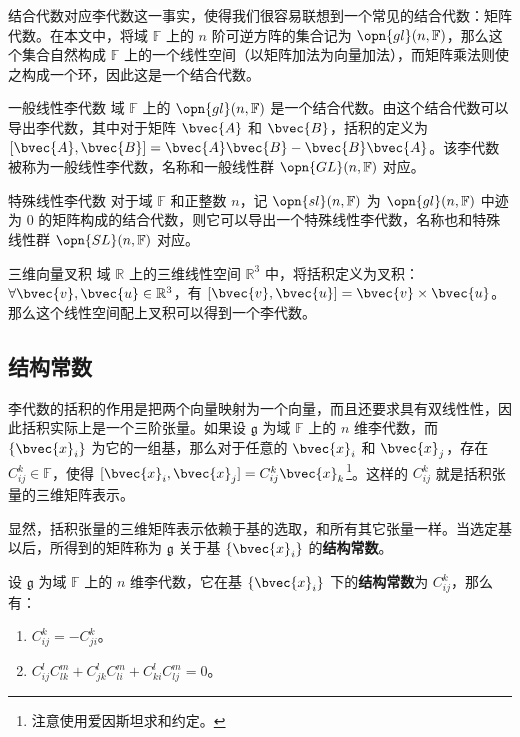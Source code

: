 结合代数对应李代数这一事实，使得我们很容易联想到一个常见的结合代数：矩阵代数。在本文中，将域 $\mathbb{F}$ 上的 $n$ 阶可逆方阵的集合记为 $\opn{gl}(n, \mathbb{F})$，那么这个集合自然构成 $\mathbb{F}$ 上的一个线性空间（以矩阵加法为向量加法），而矩阵乘法则使之构成一个环，因此这是一个结合代数。

\begin{example}{一般线性李代数}
域 $\mathbb{F}$ 上的 $\opn{gl}(n, \mathbb{F})$ 是一个结合代数。由这个结合代数可以导出李代数，其中对于矩阵 $\bvec{A}$ 和 $\bvec{B}$，括积的定义为 $[\bvec{A}, \bvec{B}]=\bvec{A}\bvec{B}-\bvec{B}\bvec{A}$。该李代数被称为一般线性李代数，名称和一般线性群 $\opn{GL}(n, \mathbb{F})$ 对应。%
\end{example}

\begin{example}{特殊线性李代数}
对于域 $\mathbb{F}$ 和正整数 $n$，记 $\opn{sl}(n, \mathbb{F})$ 为 $\opn{gl}(n, \mathbb{F})$ 中迹为 $0$ 的矩阵构成的结合代数，则它可以导出一个特殊线性李代数，名称也和特殊线性群 $\opn{SL}(n, \mathbb{F})$ 对应。
\end{example}

\begin{example}{三维向量叉积}\label{LieAlg_ex1}
域 $\mathbb{R}$ 上的三维线性空间 $\mathbb{R}^3$ 中，将括积定义为叉积：$\forall \bvec{v}, \bvec{u}\in \mathbb{R}^3$，有 $[\bvec{v}, \bvec{u}]=\bvec{v}\times\bvec{u}$。那么这个线性空间配上叉积可以得到一个李代数。
\end{example}

\subsection{结构常数}

李代数的括积的作用是把两个向量映射为一个向量，而且还要求具有双线性性，因此括积实际上是一个三阶张量。如果设 $\mathfrak{g}$ 为域 $\mathbb{F}$ 上的 $n$ 维李代数，而 $\{\bvec{x}_i\}$ 为它的一组基，那么对于任意的 $\bvec{x}_i$ 和 $\bvec{x}_j$，存在 $C^k_{ij}\in\mathbb{F}$，使得 $[\bvec{x}_i, \bvec{x}_j]=C^k_{ij}\bvec{x}_k$\footnote{注意使用爱因斯坦求和约定。}。这样的 $C^k_{ij}$ 就是括积张量的三维矩阵表示。

显然，括积张量的三维矩阵表示依赖于基的选取，和所有其它张量一样。当选定基以后，所得到的矩阵称为 $\mathfrak{g}$ 关于基 $\{\bvec{x}_i\}$ 的\textbf{结构常数}。

\begin{theorem}{}\label{LieAlg_the1}
设 $\mathfrak{g}$ 为域 $\mathbb{F}$ 上的 $n$ 维李代数，它在基 $\{\bvec{x}_i\}$ 下的\textbf{结构常数}为 $C^k_{ij}$，那么有：
\begin{enumerate}
\item $C^k_{ij}=-C^k_{ji}$。
\item $C^l_{ij}C^m_{lk}+C^l_{jk}C^m_{li}+C^l_{ki}C^m_{lj}=0$。
\end{enumerate}
\end{theorem}

